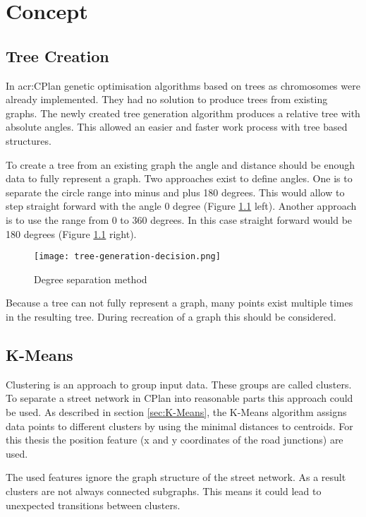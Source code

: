 \chapter{Concept}
\section{Tree Creation}
\label{sec:tree_creation_angle}
In \acrshort{acr:CPlan} genetic optimisation algorithms based on trees as chromosomes were already implemented. They had no solution to produce trees from existing graphs. The newly created tree generation algorithm produces a relative tree with absolute angles. This allowed an easier and faster work process with tree based structures.

To create a tree from an existing graph the angle and distance should be enough data to fully represent a graph.
Two approaches exist to define angles. One is to separate the circle range into minus and plus 180 degrees. This would allow to step straight forward with the angle 0 degree (Figure \ref{fig:tree-generation-decision} left). Another approach is to use the range from 0 to 360 degrees. In this case straight forward would be 180 degrees (Figure \ref{fig:tree-generation-decision} right).

\begin{figure}[!ht]
    \centering
    \texttt{[image: tree-generation-decision.png]}
    \caption{Degree separation method \label{fig:tree-generation-decision}}
\end{figure}

Because a tree can not fully represent a graph, many points exist multiple times in the resulting tree. During recreation of a graph this should be considered.

\FloatBarrier
\pagebreak
\section{K-Means}
Clustering is an approach to group input data. These groups are called clusters. To separate a street network in CPlan into reasonable parts this approach could be used. As described in section \ref{sec:K-Means}, the K-Means algorithm assigns data points to different clusters by using the minimal distances to centroids. For this thesis the position feature (x and y coordinates of the road junctions) are used.

The used features ignore the graph structure of the street network. As a result clusters are not always connected subgraphs. This means it could lead to unexpected transitions between clusters.

